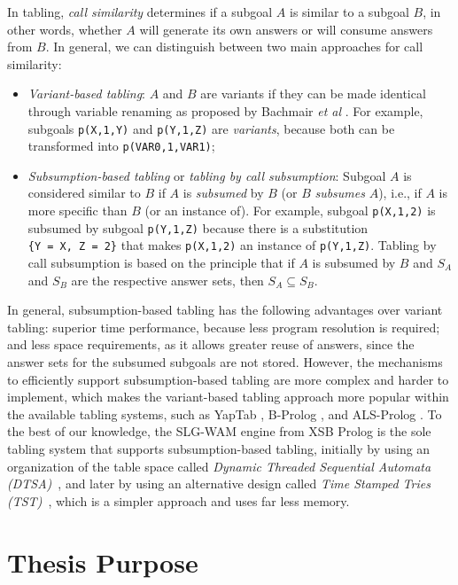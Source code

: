 In tabling, \emph{call similarity} determines if a subgoal $A$ is similar to a subgoal $B$,
in other words, whether $A$ will generate its own answers or will consume answers from $B$. In general,
we can distinguish between two main approaches for call similarity:

\begin{itemize}
   \item \emph{Variant-based tabling}: $A$ and $B$ are variants if they can be made identical
   through variable renaming as proposed by Bachmair \textit{et al} \cite{Bachmair-93}.
   For example, subgoals \texttt{p(X,1,Y)} and \texttt{p(Y,1,Z)} are \emph{variants},
   because both can be transformed into \texttt{p(VAR0,1,VAR1)};
   \item \emph{Subsumption-based tabling} or \emph{tabling by call subsumption}: Subgoal $A$ is considered similar
   to $B$ if $A$ is \emph{subsumed} by $B$ (or $B$ \emph{subsumes} $A$), i.e., if $A$ is more specific than $B$
   (or an instance of). For example, subgoal \texttt{p(X,1,2)} is subsumed by subgoal \texttt{p(Y,1,Z)} because there
   is a substitution \texttt{\{Y~=~X,~Z~=~2\}} that makes \texttt{p(X,1,2)} an instance of \texttt{p(Y,1,Z)}. Tabling by call
   subsumption is based on the principle that if $A$ is subsumed by $B$ and $S_A$ and $S_B$ are the respective
   answer sets, then $S_A \subseteq S_B$.
\end{itemize}

In general, subsumption-based tabling has the following advantages over variant tabling:
superior time performance, because less program resolution is required; and less space requirements,
as it allows greater reuse of answers, since the answer sets for the subsumed subgoals are not stored.
However, the mechanisms to efficiently support subsumption-based tabling are more complex and harder to
implement, which makes the variant-based tabling approach more popular within the available tabling systems,
such as YapTab \cite{Rocha-00a}, B-Prolog \cite{Zhou-00}, and ALS-Prolog \cite{Guo-01}.
To the best of our knowledge, the SLG-WAM \cite{Sagonas-98} engine from XSB Prolog is the sole tabling system that supports
subsumption-based tabling, initially by using an organization of the table space called
\emph{Dynamic Threaded Sequential Automata (DTSA)}~\cite{Rao-96}, and later by using an alternative design called
\emph{Time Stamped Tries (TST)}~\cite{Johnson-99}, which is a simpler approach and uses far less memory.

\section{Thesis Purpose}


